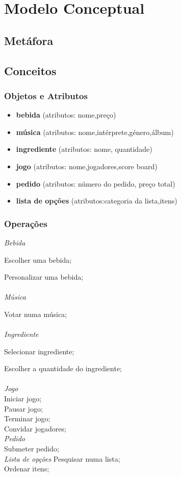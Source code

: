 \documentclass{article}
\begin{document}
\section*{Modelo Conceptual}



\subsection*{Metáfora}

\subsection*{Conceitos}
\subsubsection*{Objetos e Atributos}
\begin{itemize}
\item\textbf{bebida} (atributos: nome,preço)
\item\textbf{música} (atributos: nome,intérprete,género,álbum)
\item\textbf{ingrediente} (atributos: nome, quantidade)
\item\textbf{jogo} (atributos: nome,jogadores,score board)
\item\textbf{pedido} (atributos: número do pedido, preço total)
\item\textbf{lista de opções} (atributos:categoria da lista,itens)
\end{itemize}

\subsubsection*{Operações}
\textit{Bebida}

Escolher uma bebida;

Personalizar uma bebida;\\\\	
\textit{Música}

 Votar numa música;\\\\
\textit{Ingrediente}

		Selecionar ingrediente;

		Escolher a quantidade do ingrediente;\\\\
\textit{Jogo}\\
		Iniciar jogo;\\
		Pausar jogo;\\
		Terminar jogo;\\
		Convidar jogadores;\\
\textit{Pedido}\\
		Submeter pedido;\\
\textit{Lista de opções}
		Pesquisar numa lista;\\
		Ordenar itens;\\
\end{document}
